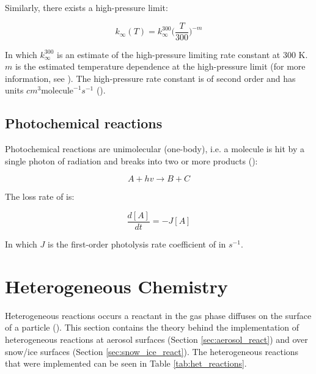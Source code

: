 \medskip

Similarly, there exists a high-pressure limit:

\begin{equation}
    k_\infty(T) = k_\infty^{300}\Big(\frac{T}{300}\Big)^{-m}
    \label{eq:3b_high_pressure}
\end{equation}

In which $k_\infty^{300}$ is an estimate of the high-pressure limiting rate constant at 300 K. $m$ is the estimated temperature dependence at the high-pressure limit (for more information, see \cite{JPL}). The high-pressure rate constant is of second order and has units $cm^3\text{molecule}^{-1}s^{-1}$ (\cite{AtmModFund}).


\subsection{Photochemical reactions}\label{sec:pchem_reactions}

Photochemical reactions are unimolecular (one-body), i.e. a molecule is hit by a single photon of radiation and breaks into two or more products (\cite{AtmModFund}):

\begin{equation*}
    A + hv \rightarrow B + C
\end{equation*}

The loss rate of  is: 

\begin{equation*}
    \frac{d[A]}{dt} = -J[A]
\end{equation*}

In which $J$ is the first-order photolysis rate coefficient of  in $s^{-1}$. 


\section{Heterogeneous Chemistry}\label{sec:het_chem}

Heterogeneous reactions occurs a reactant in the gas phase diffuses on the surface of a particle (\cite{DAVIES2018}). This section contains the theory behind the implementation of heterogeneous reactions at aerosol surfaces (Section \ref{sec:aerosol_react}) and over snow/ice surfaces (Section \ref{sec:snow_ice_react}). The heterogeneous reactions that were implemented can be seen in Table \ref{tab:het_reactions}. 



